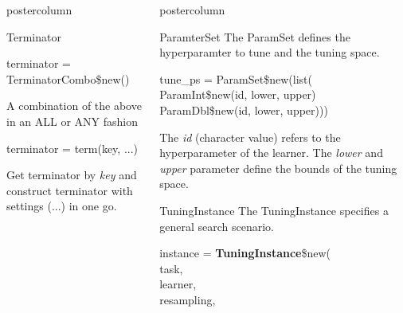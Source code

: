 \documentclass{beamer}
\newlength{\columnheight} %
\begin{document}
\begin{frame}[fragile]{}
\begin{columns}
\begin{column}{.245\textwidth}
\begin{beamercolorbox}[center]{postercolumn}
\begin{minipage}{.98\textwidth}
{\begin{myblock}{Terminator}
						\\
						\begin{codebox}
							terminator = TerminatorCombo\$new()
						\end{codebox}
						A combination of the above in an ALL or ANY fashion
						\\
						\begin{codebox}
							terminator = term(key, ...)
						\end{codebox}
						Get terminator by \textit{key} and construct terminator with settings (...) in one go. 
					\end{myblock}	
					\vfill}
				\end{minipage}
			\end{beamercolorbox}
		\end{column}
		\begin{column}{.245\textwidth}
			\begin{beamercolorbox}[center]{postercolumn}
				\begin{minipage}{.98\textwidth}
					\parbox[t][\columnheight]{\textwidth}{
						\begin{myblock}{ParamterSet}
						The ParamSet defines the hyperparamter to tune and the tuning space.
							\\
							\begin{codeboxmultiline}[width=18cm]
								tune\_ps = ParamSet\$new(list(\\
								\hspace*{1ex}ParamInt\$new(id, lower, upper)\\
								\hspace*{1ex}ParamDbl\$new(id, lower, upper)))
							\end{codeboxmultiline}
					The \textit{id} (character value) refers to the hyperparameter of the learner. The \textit{lower} and \textit{upper} parameter define the bounds of the tuning space. 	
						\end{myblock}	
					\begin{myblock}{TuningInstance}
						The TuningInstance specifies a general search scenario.
						\\
						\begin{codeboxmultiline}[width=18cm]
							instance = \textbf{TuningInstance}\$new(\\
							\hspace*{1ex}task,\\
							\hspace*{1ex}learner,\\
							\hspace*{1ex}resampling,\\

\end{codeboxmultiline}
\end{myblock}}
\end{minipage}
\end{beamercolorbox}
\end{column}
\end{columns}
\end{frame}
\end{document}
